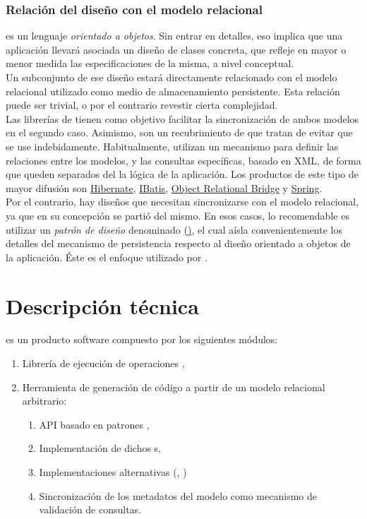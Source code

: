 \documentclass[dvips]{article}
\begin{document}
\subsubsection{Relaci\'on del dise\~no con el modelo relacional}
 es un lenguaje \textit{orientado a objetos}. Sin entrar en
detalles, eso implica que una aplicaci\'on  llevar\'a
asociada un dise\~no de clases concreta, que refleje en mayor o menor
medida las especificaciones de la misma, a nivel conceptual.\\
Un subconjunto de ese dise\~no estar\'a directamente relacionado con
el modelo relacional utilizado como medio de almacenamiento
persistente. Esta relaci\'on puede ser trivial, o por el contrario
revestir cierta complejidad.\\
Las librer\'i{}as de  tienen como objetivo facilitar
la sincronizaci\'on de ambos modelos en el segundo caso. Asimismo, son
un recubrimiento de  que tratan de evitar que se use
indebidamente. Habitualmente, utilizan un mecanismo para definir las
relaciones entre los modelos, y las consultas espec\'i{}ficas, basado
en XML, de forma que queden separados del la l\'ogica de la
aplicaci\'on. Los productos de este tipo de mayor difusi\'on son
\href{http://www.hibernate.org}{Hibernate},
\href{http://www.ibatis.com}{IBatis},
\href{http://db.apache.org/ojb}{Object Relational Bridge} y
\href{http://www,springframework.org}{Spring}.\\
Por el contrario, hay dise\~nos que necesitan sincronizarse con el
modelo relacional, ya que en su concepci\'on se parti\'o del mismo. En
esos casos, lo recomendable es utilizar un \textit{patr\'on de
dise\~no} denominado
\href{http://java.sun.com/blueprints/corej2eepatterns/Patterns/DataAccessObject.html}{ ()}, el
cual a\'i{}sla convenientemente los detalles del mecanismo de
persistencia respecto al dise\~no orientado a objetos de la
aplicaci\'on. \'Este es el enfoque utilizado por \queryj.

\section{Descripci\'on t\'ecnica}
\queryj es un producto software compuesto por los siguientes m\'odulos:
\begin{enumerate}
  \item Librer\'i{}a  de ejecuci\'on de operaciones
  ,
  \item Herramienta de generaci\'on de c\'odigo a partir de un modelo
  relacional arbitrario:
  \begin{enumerate}
    \item API basado en patrones ,
    \item Implementaci\'on  de dichos s,
    \item Implementaciones alternativas (, )
    \item Sincronizaci\'on de los metadatos del modelo como mecanismo
    de validaci\'on de consultas.
  \end{enumerate}
\end{enumerate}
\end{document}
